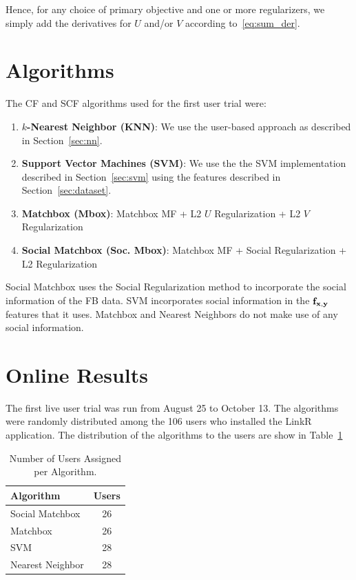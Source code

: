 Hence, for any choice of primary objective and one or more regularizers,
we simply add the derivatives for $U$ and/or $V$ 
according to~\eqref{eq:sum_der}.



\section{Algorithms}

The CF and SCF algorithms used for the first user trial were:

\begin{enumerate}
\item{ {\bf $k$-Nearest Neighbor (KNN)}: We use the user-based approach as described in Section~\ref{sec:nn}.}
\item{{\bf Support Vector Machines (SVM)}: We use the the SVM implementation described in Section~\ref{sec:svm} using the features described in Section~\ref{sec:dataset}.}
\item{{\bf Matchbox (Mbox)}: Matchbox MF  + L2 $U$ Regularization + L2 $V$ Regularization}
\item{{\bf Social Matchbox (Soc. Mbox)}: Matchbox MF + Social Regularization + L2 Regularization}
\end{enumerate}

Social Matchbox uses the Social Regularization method to incorporate the social information of the FB data. SVM incorporates social information in the $\mathbf{f}_{\mathbf{x},\mathbf{y}}$ features that it uses. Matchbox and Nearest Neighbors do not make use of any social information.

\section{Online Results}

The first live user trial was run from August 25 to October 13. The algorithms were randomly distributed among the 106 users who installed the LinkR application. The distribution of the algorithms to the users are show in Table~\ref{tab:Assigned1}

\begin{table}[t!]
\centering
\begin{tabular}{| l | c |}
\hline
{\bf Algorithm} & {\bf Users} \\
\hline
Social Matchbox & 26\\
Matchbox  & 26 \\
SVM & 28 \\
Nearest Neighbor & 28 \\
\hline
\end{tabular}
\caption{Number of Users Assigned per Algorithm.}
\label{tab:Assigned1}
\end{table}

